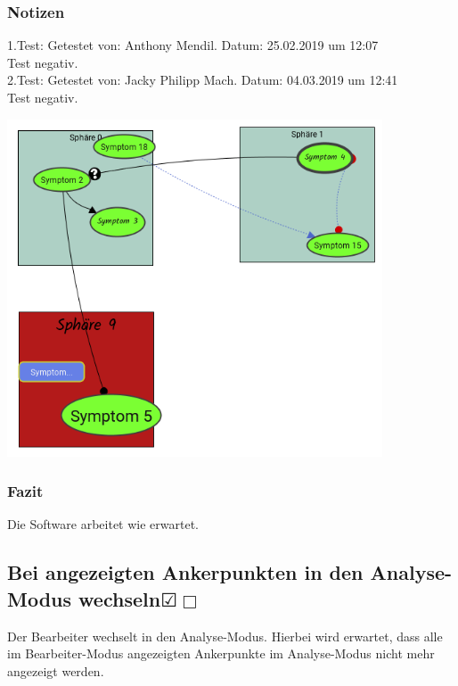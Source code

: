\documentclass[enabledeprecatedfontcommands]{scrartcl}
\newcommand{\subsectiont}[2]{\subsection[#1]{#1{\normalsize\normalfont #2}}}
\newcommand{\leer}{$\Box$}
\newcommand{\ok}{$\CheckedBox$}
\begin{document}
\subsubsection{Notizen}
1.Test: Getestet von: Anthony Mendil. Datum: 25.02.2019 um 12:07 \\
Test negativ.\\
2.Test: Getestet von: Jacky Philipp Mach. Datum: 04.03.2019 um 12:41 \\
Test negativ.
\begin{center}
\includegraphics[height=10cm]{3_42.PNG}
\end{center}
\subsubsection{Fazit}
Die Software arbeitet wie erwartet.

\subsectiont{Bei angezeigten Ankerpunkten in den Analyse-Modus wechseln}{\dotfill\XBox\ok\leer}
Der Bearbeiter wechselt in den Analyse-Modus. Hierbei wird erwartet, dass alle im Bearbeiter-Modus angezeigten Ankerpunkte im Analyse-Modus nicht mehr angezeigt werden. 
\end{document}
